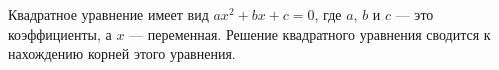 \documentclass[preview]{standalone}
\begin{document}
\begin{center}
Квадратное уравнение имеет вид $ax^2 + bx + c = 0$, где $a$, $b$ и $c$ — это коэффициенты, а $x$ — переменная. Решение квадратного уравнения сводится к нахождению корней этого уравнения.
\end{center}
\end{document}
